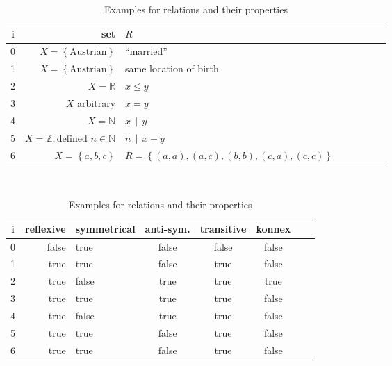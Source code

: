 \documentclass[a4paper,landscape,twocolumn]{article}
\newcommand\set[1]{\left\{#1\right\}}
\newcommand\divides[2]{#1\,\mid\,#2}
\begin{document}
\begin{table}[!ht]
  \begin{center}
    \begin{tabular}{crlccccc}
     \hline \hline
      i & set & $R$ \\
     \hline
      0 & $X = \set{\text{Austrian}}$ & \enquote{married} \\
      1 & $X = \set{\text{Austrian}}$ & same location of birth \\
      2 & $X = \mathbb{R}$ & $x \leq y$ \\
      3 & $X$ arbitrary & $x = y$ \\
      4 & $X = \mathbb{N}$ & $\divides{x}{y}$ \\
      5 & $X = \mathbb{Z}, \text{defined } n \in \mathbb{N}$ & $\divides{n}{x - y}$ \\
      6 & $X = \set{a, b, c}$ & $R = \set{(a, a), (a, c), (b, b), (c, a), (c, c)}$ \\
     \hline \hline
    \end{tabular} \\[5pt]
    \begin{tabular}{crlccccc}
     \hline \hline
        i & reflexive & symmetrical & anti-sym. & transitive & konnex \\
     \hline
        0 & false & true & false & false & false \\
        1 & true & true & false & true & false \\
        2 & true & false & true & true & true \\
        3 & true & true & true & true & false \\
        4 & true & false & true & true & false \\
        5 & true & true & false & true & false \\
        6 & true & true & false & true & false \\
     \hline \hline
    \end{tabular}
    \caption{Examples for relations and their properties}
  \end{center}
\end{table}
\end{document}
